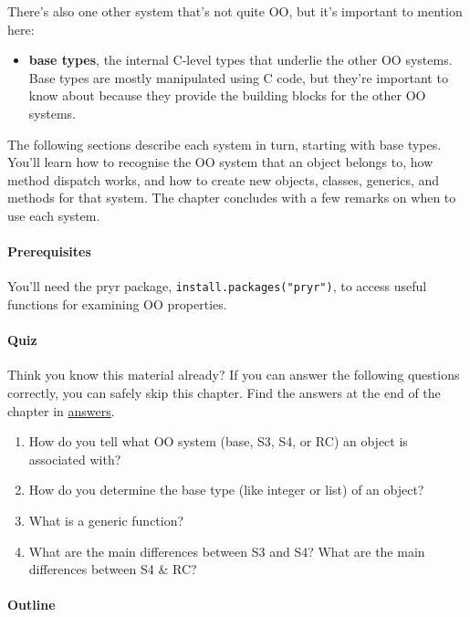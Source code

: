 There's also one other system that's not quite OO, but it's important to
mention here:

\begin{itemize}
\itemsep1pt\parskip0pt
\item
  \textbf{base types}, the internal C-level types that underlie the
  other OO systems. Base types are mostly manipulated using C code, but
  they're important to know about because they provide the building
  blocks for the other OO systems.
\end{itemize}

The following sections describe each system in turn, starting with base
types. You'll learn how to recognise the OO system that an object
belongs to, how method dispatch works, and how to create new objects,
classes, generics, and methods for that system. The chapter concludes
with a few remarks on when to use each system.

\paragraph{Prerequisites}

You'll need the pryr package, \texttt{install.packages("pryr")}, to
access useful functions for examining OO properties.

\paragraph{Quiz}

Think you know this material already? If you can answer the following
questions correctly, you can safely skip this chapter. Find the answers
at the end of the chapter in \hyperref[oo-answers]{answers}.

\begin{enumerate}
\def\labelenumi{\arabic{enumi}.}
\item
  How do you tell what OO system (base, S3, S4, or RC) an object is
  associated with?
\item
  How do you determine the base type (like integer or list) of an
  object?
\item
  What is a generic function?
\item
  What are the main differences between S3 and S4? What are the main
  differences between S4 \& RC?
\end{enumerate}

\paragraph{Outline}

